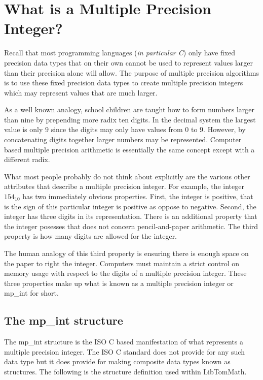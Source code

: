 \documentclass[b5paper]{book}
\begin{document}
\section{What is a Multiple Precision Integer?}
Recall that most programming languages (\textit{in particular C}) only have fixed precision data types that on their own cannot be used
to represent values larger than their precision alone will allow. The purpose of multiple precision algorithms is to use these fixed precision
data types to create multiple precision integers which may represent values that are much larger.  

As a well known analogy, school children are taught how to form numbers larger than nine by prepending more radix ten digits.  In the decimal system
the largest value is only $9$ since the digits may only have values from $0$ to $9$.  However, by concatenating digits together larger numbers 
may be represented.  Computer based multiple precision arithmetic is essentially the same concept except with a different radix.

What most people probably do not think about explicitly are the various other attributes that describe a multiple precision integer.  For example,
the integer $154_{10}$ has two immediately obvious properties.  First, the integer is positive, that is the sign of this particular integer 
is positive as oppose to negative.  Second, the integer has three digits in its representation.  There is an additional property that the integer 
posesses that does not concern pencil-and-paper arithmetic.  The third property is how many digits are allowed for the integer.  

The human analogy of this third property is ensuring there is enough space on the paper to right the integer.  Computers must maintain a
strict control on memory usage with respect to the digits of a multiple precision integer.  These three properties make up what is known
as a multiple precision integer or mp\_int for short.  

\subsection{The mp\_int structure}
The mp\_int structure is the ISO C based manifestation of what represents a multiple precision integer.  The ISO C standard does not provide for 
any such data type but it does provide for making composite data types known as structures.  The following is the structure definition 
used within LibTomMath.
\end{document}
